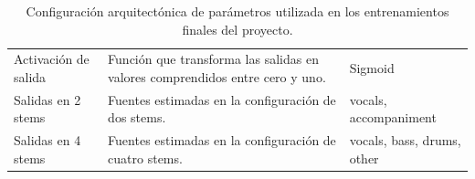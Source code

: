 \begin{table}[H]
\begin{tabularx}{\textwidth}{
        >{\raggedright\arraybackslash}p{}
        >{\raggedright\arraybackslash}X
        >{\raggedright\arraybackslash}p{}
    }
        Activación de salida &
        Función que transforma las salidas en valores comprendidos entre cero y uno. &
        Sigmoid \\

        Salidas en 2 stems &
        Fuentes estimadas en la configuración de dos stems. &
        vocals, accompaniment \\

        Salidas en 4 stems &
        Fuentes estimadas en la configuración de cuatro stems. &
        vocals, bass, drums, other \\

        \hline
    \end{tabularx}

    \caption{Configuración arquitectónica de parámetros utilizada en los entrenamientos finales del proyecto.}
    \label{tab:parametros_modelo}
\end{table}


